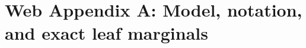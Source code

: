 %

\newtheorem{thmA}{Theorem}
\renewcommand{\thethmA}{A\arabic{thmA}}
\newtheorem{lemA}{Lemma}
\renewcommand{\thelemA}{A\arabic{lemA}}
\newtheorem{propA}{Proposition}
\renewcommand{\thepropA}{A\arabic{propA}}
\newtheorem{corA}{Corollary}
\renewcommand{\thecorA}{A\arabic{corA}}
\theoremstyle{definition}
\newtheorem{assA}{Assumption}
\renewcommand{\theassA}{A\arabic{assA}}
\newtheorem{remA}{Remark}
\renewcommand{\theremA}{A\arabic{remA}}
\theoremstyle{plain}
\renewcommand{\theequation}{A\arabic{equation}}
\newcommand{\Pspike}{P_{\mathrm{spike}}}
\newcommand{\ess}{\mathrm{ESS}}
\newcommand{\Phibar}{\bar\Phi}
\newcommand{\tr}{^{\top}}

\section*{Web Appendix A: Model, notation, and exact leaf marginals}

